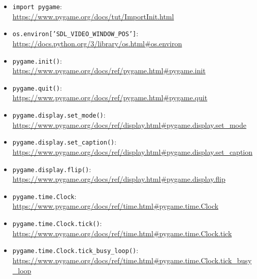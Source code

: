 \begin{itemize}
	\item \texttt{import pygame}:\\ \url{https://www.pygame.org/docs/tut/ImportInit.html}
	
	\item \texttt{os.environ['SDL\_VIDEO\_WINDOW\_POS']}:\\
	\url{https://docs.python.org/3/library/os.html#os.environ}
	
	\item \texttt{pygame.init()}:
	\\
	\url{https://www.pygame.org/docs/ref/pygame.html#pygame.init}
	
	\item \texttt{pygame.quit()}:
	\\
	\url{https://www.pygame.org/docs/ref/pygame.html#pygame.quit}
	
	\item \texttt{pygame.display.set\_mode()}:
	\\
	\url{https://www.pygame.org/docs/ref/display.html#pygame.display.set_mode}
	
	\item \texttt{pygame.display.set\_caption()}:
	\\
	\url{https://www.pygame.org/docs/ref/display.html#pygame.display.set_caption}
	
	\item \texttt{pygame.display.flip()}:
	\\
	\url{https://www.pygame.org/docs/ref/display.html#pygame.display.flip}
	
	\item \texttt{pygame.time.Clock}:
	\\
	\url{https://www.pygame.org/docs/ref/time.html#pygame.time.Clock}
	
	\item \texttt{pygame.time.Clock.tick()}:
	\\
	\url{https://www.pygame.org/docs/ref/time.html#pygame.time.Clock.tick}
	
	\item \texttt{pygame.time.Clock.tick\_busy\_loop()}:
	\\
	\url{https://www.pygame.org/docs/ref/time.html#pygame.time.Clock.tick_busy_loop}
	

\end{itemize}
